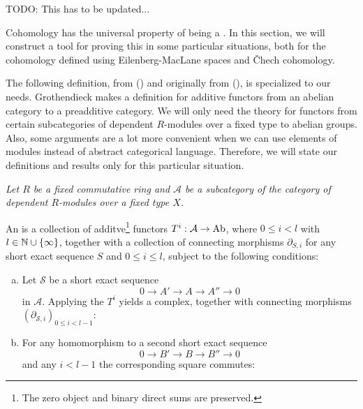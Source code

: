 TODO: This has to be updated...

Cohomology has the universal property of being a .
In this section, we will construct a tool for proving this in some particular situations,
both for the cohomology defined using Eilenberg-MacLane spaces and \v{C}hech cohomology.

The following definition, from (\cite[2.1]{tohoku-translation}) and originally from (\cite{tohoku1957}), is specialized to our needs.
Grothendieck makes a definition for additive functors from an abelian category to a preadditive category.
We will only need the theory for functors from certain subcategories of dependent $R$-modules over a fixed type to abelian groups.
Also, some arguments are a lot more convenient when we can use elements of modules instead of abstract categorical language.
Therefore, we will state our definitions and results only for this particular situation.

\emph{Let $R$ be a fixed commutative ring and $\mathcal A$ be a subcategory of the category of dependent $R$-modules over a fixed type $X$.}

\begin{definition}
  An  is a collection of additve\footnote{
    The zero object and binary direct sums are preserved.
  }
  functors
  $T^i:\mathcal A\to \operatorname{Ab}$, where $0\leq i < l$ with $l\in\mathbb{N}\cup\{\infty\}$,
  together with a collection of connecting morphisms $\partial_{S,i}$ for any short exact sequence $S$ and $0\leq i\le l$, subject to the following conditions:
  \begin{enumerate}[(a)]
  \item Let $\mathcal{S}$ be a short exact sequence
    \[ 0\to A'\to A\to A''\to 0\]
    in $\mathcal A$. Applying the $T^i$ yields a complex, together with connecting morphisms $(\partial_{\mathcal{S},i})_{0\leq i<l-1}$:
    \begin{center}
    \end{center}
  \item For any homomorphism to a second short exact sequence
    \[ 0\to B'\to B\to B''\to 0\]
    and any $i<l-1$ the corresponding square commutes:
    \begin{center}
    \end{center}
  \end{enumerate}
\end{definition}

